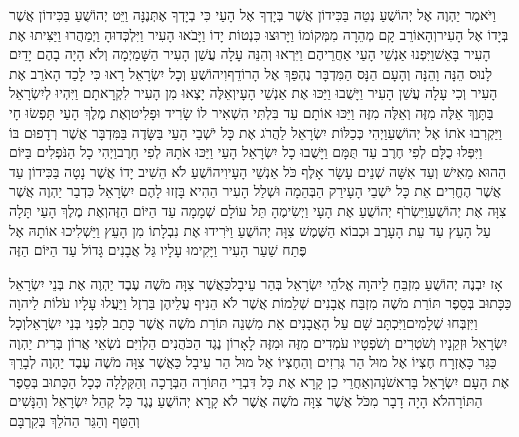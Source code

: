 \documentclass[../main/main.tex]{subfiles}
\begin{document}
\begin{multicols*}{\ncols}
וַיֹּאמֶר יַהְוֶה אֶל יְהוֹשֻׁעַ נְטֵה בַּכִּידוֹן אֲשֶׁר בְּיָדְךָ אֶל הָעַי כִּי בְיָדְךָ אֶתְּנֶנָּה וַיֵּט יְהוֹשֻׁעַ בַּכִּידוֹן אֲשֶׁר בְּיָדוֹ אֶל הָעִיר\PreVerseSpace{}וְהָאוֹרֵב קָם מְהֵרָה מִמְּקוֹמוֹ וַיָּרוּצוּ כִּנְטוֹת יָדוֹ וַיָּבֹאוּ הָעִיר וַיִּלְכְּדוּהָ וַיְמַהֲרוּ וַיַּצִּיתוּ אֶת הָעִיר בָּאֵשׁ\PreVerseSpace{}וַיִּפְנוּ אַנְשֵׁי הָעַי אַחֲרֵיהֶם וַיִּרְאוּ וְהִנֵּה עָלָה עֲשַׁן הָעִיר הַשָּׁמַיְמָה וְלֹא הָיָה בָהֶם יָדַיִם לָנוּס הֵנָּה וָהֵנָּה וְהָעָם הַנָּס הַמִּדְבָּר נֶהְפַּךְ אֶל הָרוֹדֵף\PreVerseSpace{}וִיהוֹשֻׁעַ וְכָל יִשְׂרָאֵל רָאוּ כִּי לָכַד הָאֹרֵב אֶת הָעִיר וְכִי עָלָה עֲשַׁן הָעִיר וַיָּשֻׁבוּ וַיַּכּוּ אֶת אַנְשֵׁי הָעָי\PreVerseSpace{}וְאֵלֶּה יָצְאוּ מִן הָעִיר לִקְרָאתָם וַיִּהְיוּ לְיִשְׂרָאֵל בַּתָּוֶךְ אֵלֶּה מִזֶּה וְאֵלֶּה מִזֶּה וַיַּכּוּ אוֹתָם עַד בִּלְתִּי הִשְׁאִיר לוֹ שָׂרִיד וּפָלִיט\PreVerseSpace{}וְאֶת מֶלֶךְ הָעַי תָּפְשׂוּ חָי וַיַּקְרִבוּ אֹתוֹ אֶל יְהוֹשֻׁעַ\PreVerseSpace{}וַיְהִי כְּכַלּוֹת יִשְׂרָאֵל לַהֲרֹג אֶת כָּל יֹשְׁבֵי הָעַי בַּשָּׂדֶה בַּמִּדְבָּר אֲשֶׁר רְדָפוּם בּוֹ וַיִּפְּלוּ כֻלָּם לְפִי חֶרֶב עַד תֻּמָּם וַיָּשֻׁבוּ כָל יִשְׂרָאֵל הָעַי וַיַּכּוּ אֹתָהּ לְפִי חָרֶב\PreVerseSpace{}וַיְהִי כָל הַנֹּפְלִים בַּיּוֹם הַהוּא מֵאִישׁ וְעַד אִשָּׁה שְׁנֵים עָשָׂר אָלֶף כֹּל אַנְשֵׁי הָעָי\PreVerseSpace{}וִיהוֹשֻׁעַ לֹא הֵשִׁיב יָדוֹ אֲשֶׁר נָטָה בַּכִּידוֹן עַד אֲשֶׁר הֶחֱרִים אֵת כָּל יֹשְׁבֵי הָעָי\PreVerseSpace{}רַק הַבְּהֵמָה וּשְׁלַל הָעִיר הַהִיא בָּזְזוּ לָהֶם יִשְׂרָאֵל כִּדְבַר יַהְוֶה אֲשֶׁר צִוָּה אֶת יְהוֹשֻׁעַ\PreVerseSpace{}וַיִּשְׂרֹף יְהוֹשֻׁעַ אֶת הָעָי וַיְשִׂימֶהָ תֵּל עוֹלָם שְׁמָמָה עַד הַיּוֹם הַזֶּה\PreVerseSpace{}וְאֶת מֶלֶךְ הָעַי תָּלָה עַל הָעֵץ עַד עֵת הָעָרֶב וּכְבוֹא הַשֶּׁמֶשׁ צִוָּה יְהוֹשֻׁעַ וַיֹּרִידוּ אֶת נִבְלָתוֹ מִן הָעֵץ וַיַּשְׁלִיכוּ אוֹתָהּ אֶל פֶּתַח שַׁעַר הָעִיר וַיָּקִימוּ עָלָיו גַּל אֲבָנִים גָּדוֹל עַד הַיּוֹם הַזֶּה\OpenSection{}\par
{}אָז יִבְנֶה יְהוֹשֻׁעַ מִזְבֵּחַ לַיהוָה אֱלֹהֵי יִשְׂרָאֵל בְּהַר עֵיבָל\PreVerseSpace{}כַּאֲשֶׁר צִוָּה מֹשֶׁה עֶבֶד יַהְוֶה אֶת בְּנֵי יִשְׂרָאֵל כַּכָּתוּב בְּסֵפֶר תּוֹרַת מֹשֶׁה מִזְבַּח אֲבָנִים שְׁלֵמוֹת אֲשֶׁר לֹא הֵנִיף עֲלֵיהֶן בַּרְזֶל וַיַּעֲלוּ עָלָיו עֹלוֹת לַיהוָה וַיִּזְבְּחוּ שְׁלָמִים\PreVerseSpace{}וַיִּכְתָּב שָׁם עַל הָאֲבָנִים אֵת מִשְׁנֵה תּוֹרַת מֹשֶׁה אֲשֶׁר כָּתַב לִפְנֵי בְּנֵי יִשְׂרָאֵל\PreVerseSpace{}וְכָל יִשְׂרָאֵל וּזְקֵנָיו וְשֹׁטְרִים וְשֹׁפְטָיו עֹמְדִים מִזֶּה וּמִזֶּה לָאָרוֹן נֶגֶד הַכֹּהֲנִים הַלְוִיִּם נֹשְׂאֵי אֲרוֹן בְּרִית יַהְוֶה כַּגֵּר כָּאֶזְרָח חֶצְיוֹ אֶל מוּל הַר גְּרִזִים וְהַחֶצְיוֹ אֶל מוּל הַר עֵיבָל כַּאֲשֶׁר צִוָּה מֹשֶׁה עֶבֶד יַהְוֶה לְבָרֵךְ אֶת הָעָם יִשְׂרָאֵל בָּרִאשֹׁנָה\PreVerseSpace{}וְאַחֲרֵי כֵן קָרָא אֶת כָּל דִּבְרֵי הַתּוֹרָה הַבְּרָכָה וְהַקְּלָלָה כְּכָל הַכָּתוּב בְּסֵפֶר הַתּוֹרָה\PreVerseSpace{}לֹא הָיָה דָבָר מִכֹּל אֲשֶׁר צִוָּה מֹשֶׁה אֲשֶׁר לֹא קָרָא יְהוֹשֻׁעַ נֶגֶד כָּל קְהַל יִשְׂרָאֵל וְהַנָּשִׁים וְהַטַּף וְהַגֵּר הַהֹלֵךְ בְּקִרְבָּם\OpenSection{}\par

\end{multicols*}
\end{document}
